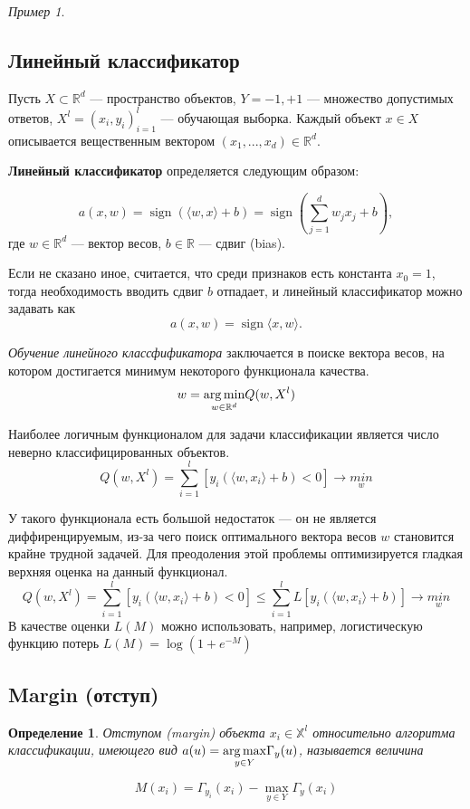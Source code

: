 \documentclass[a4paper, 12pt]{article}
\DeclareMathOperator{\sgn}{sign }
\newcommand{\argmin}{\mathop{\rm arg\,min}\limits}
\newcommand{\argmax}{\mathop{\rm arg\,max}\limits}
\theoremstyle{plain} %
\newtheorem{definition}{Определение}
\theoremstyle{definition} %
\theoremstyle{remark} %
\newtheorem{example}{Пример}
\begin{document}
\begin{example}
\subsection{Линейный классификатор}
Пусть $X \subset \mathbb{R}^{d}$ --- пространство объектов, $Y = {-1, +1}$ --- множество допустимых ответов, $X^{l} = (x_{i}, y_{i})^{l}_{i=1}$ --- обучающая выборка. Каждый объект $ x\in X$ описывается вещественным вектором $(x_{1}, ... , x_{d})\in \mathbb{R}^{d}$.

\textbf{Линейный классификатор} определяется следующим образом:

\[
	a(x,w) = \sgn(\langle w,x \rangle +b) = \sgn \left(\sum^{d}_{j=1}w_{j}x_{j}+b \right),
\]
где $w\in\mathbb{R}^{d}$ --- вектор весов, $b\in\mathbb{R}$ --- сдвиг (bias).\

Если не сказано иное, считается, что среди признаков есть константа $x_{0} = 1$, тогда необходимость вводить сдвиг $b$ отпадает, и линейный классификатор можно задавать как
\[
	a(x,w) = \sgn \langle x,w \rangle .
\]

\emph{Обучение линейного классфификатора} заключается в поиске вектора весов, на котором достигается минимум некоторого функционала качества.
\[
	w=\underset{w\in\mathbb{R}^{d}}{\argmin} Q(w,X^{l})
\]

Наиболее логичным функционалом для задачи классификации является число неверно классифицированных объектов.
\[
	Q(w,X^{l}) = \sum^{l}_{i=1}\left[ y_{i}(\langle w,x_{i} \rangle +b)<0\right] \to \underset{w}{min}
\]

У такого функционала есть большой недостаток --- он не является диффиренцируемым, из-за чего поиск оптимального вектора весов $w$ становится крайне трудной задачей. Для преодоления этой проблемы оптимизируется гладкая верхняя оценка на данный функционал.
\[
	Q(w,X^{l}) = \sum^{l}_{i=1}\left[ y_{i}(\langle w,x_{i} \rangle +b)<0\right] \leqslant \sum^{l}_{i=1}L\left[ y_{i}(\langle w,x_{i} \rangle +b)\right] \to \underset{w}{min}
\]
В качестве оценки $L(M)$ можно использовать, например, логистическую функцию потерь $L(M) = \log(1+e^{-M})$

\subsection{Margin (отступ)}

\begin{definition}
		Отступом (margin) объекта $x_{i} \in \mathbb{X}^{l}$ относительно алгоритма классификации, имеющего вид $a(u) = \underset{y\in Y}{\argmax} \Gamma_{y}(u)$, называется величина
\end{definition}
\[
	M(x_{i}) = \Gamma_{y_{i}}(x_{i}) - \underset{y\in Y}{\max} \Gamma_{y}(x_{i})
\]


\end{example}
\end{document}
